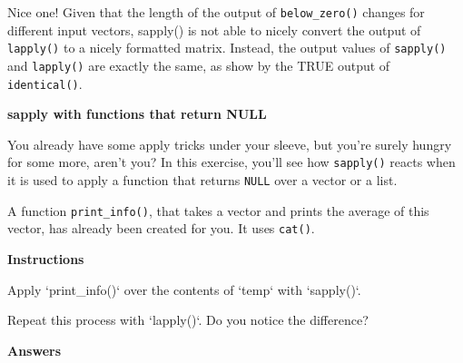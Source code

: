 \documentclass[]{article}
\newcommand{\hlstr}[1]{\textcolor[rgb]{0.251,0.627,0.251}{#1}}%
\newcommand{\hlstd}[1]{\textcolor[rgb]{0.251,0.251,0.251}{#1}}%
\newcommand{\hlkwc}[1]{\textcolor[rgb]{0.251,0.251,0.251}{#1}}%
\newenvironment{Shaded}{\begin{myshaded}}{\end{myshaded}}
\newcommand{\DataTypeTok}[1]{\hlkwc{#1}}
\newcommand{\StringTok}[1]{\hlstr{#1}}
\newcommand{\NormalTok}[1]{\hlstd{#1}}
\begin{document}
Nice one! Given that the length of the output of \texttt{below\_zero()}
changes for different input vectors, sapply() is not able to nicely
convert the output of \texttt{lapply()} to a nicely formatted matrix.
Instead, the output values of \texttt{sapply()} and \texttt{lapply()}
are exactly the same, as show by the TRUE output of
\texttt{identical()}.

\textbf{sapply with functions that return NULL}

You already have some apply tricks under your sleeve, but you're surely
hungry for some more, aren't you? In this exercise, you'll see how
\texttt{sapply()} reacts when it is used to apply a function that
returns \texttt{NULL} over a vector or a list.

A function \texttt{print\_info()}, that takes a vector and prints the
average of this vector, has already been created for you. It uses
\texttt{cat()}.

\textbf{Instructions}

\begin{Shaded}
\begin{Highlighting}[]
\OperatorTok{*}\StringTok{ }\NormalTok{Apply }\StringTok{`}\DataTypeTok{print_info()}\StringTok{`}\NormalTok{ over the contents of }\StringTok{`}\DataTypeTok{temp}\StringTok{`}\NormalTok{ with }\StringTok{`}\DataTypeTok{sapply()}\StringTok{`}\NormalTok{.}

\OperatorTok{*}\StringTok{ }\NormalTok{Repeat this process with }\StringTok{`}\DataTypeTok{lapply()}\StringTok{`}\NormalTok{. Do you notice the difference?}
\end{Highlighting}
\end{Shaded}

\textbf{Answers}
\end{document}
